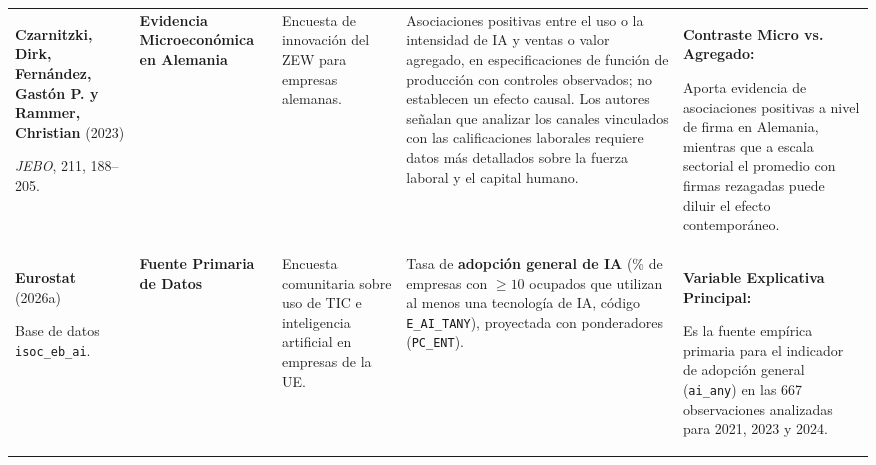 \documentclass[10pt,a4paper,landscape]{article}
\begin{document}
\begin{xltabular}{\textwidth}{@{} L{4.5cm} L{3.3cm} Y Y Y @{}}
  \textbf{Czarnitzki, Dirk, Fernández, Gastón P. y Rammer, Christian} (2023)\par
  \textit{JEBO}, 211, 188--205.\par
  [\texttt{czarnitzki2023firm}] &
  \textbf{Evidencia Microeconómica en Alemania} &
  Encuesta de innovación del ZEW para empresas alemanas. &
  Asociaciones positivas entre el uso o la intensidad de IA y ventas o valor agregado, en especificaciones de función de producción con controles observados; no establecen un efecto causal. Los autores señalan que analizar los canales vinculados con las calificaciones laborales requiere datos más detallados sobre la fuerza laboral y el capital humano. &
  \textbf{Contraste Micro vs. Agregado:}\par
  Aporta evidencia de asociaciones positivas a nivel de firma en Alemania, mientras que a escala sectorial el promedio con firmas rezagadas puede diluir el efecto contemporáneo. \\
  \textbf{Eurostat} (2026a)\par
  Base de datos \texttt{isoc\_eb\_ai}.\par
  [\texttt{eurostat\_ai}] &
  \textbf{Fuente Primaria de Datos} &
  Encuesta comunitaria sobre uso de TIC e inteligencia artificial en empresas de la UE. &
  Tasa de \textbf{adopción general de IA} (\% de empresas con $\ge 10$ ocupados que utilizan al menos una tecnología de IA, código \texttt{E\_AI\_TANY}), proyectada con ponderadores (\texttt{PC\_ENT}). &
  \textbf{Variable Explicativa Principal:}\par
  Es la fuente empírica primaria para el indicador de adopción general (\texttt{ai\_any}) en las 667 observaciones analizadas para 2021, 2023 y 2024. \\


\end{xltabular}
\end{document}
